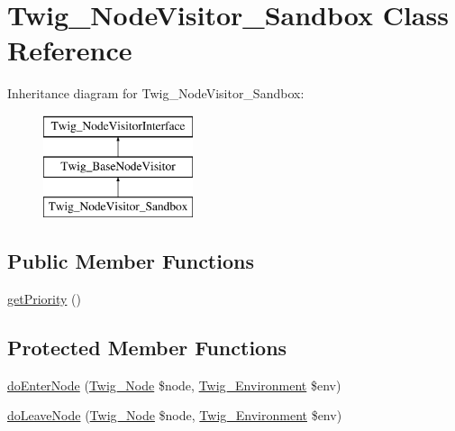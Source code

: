 \hypertarget{classTwig__NodeVisitor__Sandbox}{}\section{Twig\+\_\+\+Node\+Visitor\+\_\+\+Sandbox Class Reference}
\label{classTwig__NodeVisitor__Sandbox}
Inheritance diagram for Twig\+\_\+\+Node\+Visitor\+\_\+\+Sandbox\+:\begin{figure}[H]
\begin{center}
\leavevmode
\includegraphics[height=3.000000cm]{classTwig__NodeVisitor__Sandbox}
\end{center}
\end{figure}
\subsection*{Public Member Functions}
\begin{DoxyCompactItemize}
\item 
\hyperlink{classTwig__NodeVisitor__Sandbox_a2ed74898b12be1289706f48e9edcf331}{get\+Priority} ()
\end{DoxyCompactItemize}
\subsection*{Protected Member Functions}
\begin{DoxyCompactItemize}
\item 
\hyperlink{classTwig__NodeVisitor__Sandbox_a238a3d5ca32e04bf52e8a0859ac596d7}{do\+Enter\+Node} (\hyperlink{classTwig__Node}{Twig\+\_\+\+Node} \$node, \hyperlink{classTwig__Environment}{Twig\+\_\+\+Environment} \$env)
\item 
\hyperlink{classTwig__NodeVisitor__Sandbox_add366a182d5135d9eca7bfb4bda84af9}{do\+Leave\+Node} (\hyperlink{classTwig__Node}{Twig\+\_\+\+Node} \$node, \hyperlink{classTwig__Environment}{Twig\+\_\+\+Environment} \$env)
\end{DoxyCompactItemize}
